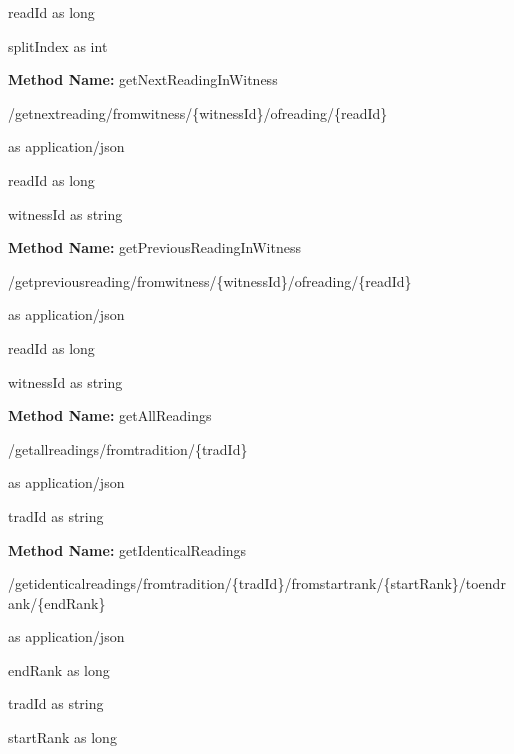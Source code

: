\begin{parameter}
readId as long
\end{parameter}
\begin{parameter}
splitIndex as int
\end{parameter}
\textbf{Method Name: }getNextReadingInWitness
\begin{get}
/getnextreading/fromwitness/\{witnessId\}/ofreading/\{readId\}
\end{get}
\begin{response}
 as application/json
\end{response}
\begin{parameter}
readId as long
\end{parameter}
\begin{parameter}
witnessId as string
\end{parameter}
\textbf{Method Name: }getPreviousReadingInWitness
\begin{get}
/getpreviousreading/fromwitness/\{witnessId\}/ofreading/\{readId\}
\end{get}
\begin{response}
 as application/json
\end{response}
\begin{parameter}
readId as long
\end{parameter}
\begin{parameter}
witnessId as string
\end{parameter}
\textbf{Method Name: }getAllReadings
\begin{get}
/getallreadings/fromtradition/\{tradId\}
\end{get}
\begin{response}
 as application/json
\end{response}
\begin{parameter}
tradId as string
\end{parameter}
\textbf{Method Name: }getIdenticalReadings
\begin{get}
/getidenticalreadings/fromtradition/\{tradId\}/fromstartrank/\{startRank\}/toendrank/\{endRank\}
\end{get}
\begin{response}
 as application/json
\end{response}
\begin{parameter}
endRank as long
\end{parameter}
\begin{parameter}
tradId as string
\end{parameter}
\begin{parameter}
startRank as long
\end{parameter}
